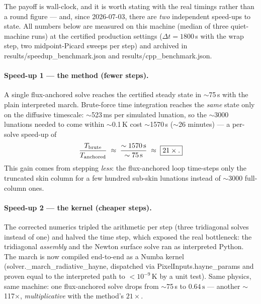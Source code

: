 \documentclass[11pt]{report}
\newcommand{\code}[1]{{\ttfamily\small #1}}
\begin{document}
The payoff is wall-clock, and it is worth stating with the real timings
rather than a round figure --- and, since 2026-07-03, there are \emph{two}
independent speed-ups to state. All numbers below are measured on this
machine (median of three quiet-machine runs) at the certified production
settings ($\Delta t = 1800$\,s with the wrap step, two midpoint-Picard
sweeps per step) and archived in \code{results/speedup\_benchmark.json}
and \code{results/cpp\_benchmark.json}.

\paragraph{\textbf{Speed-up 1 --- the method (fewer steps).}} A single
flux-anchored solve reaches the certified steady state in $\sim$75\,s with
the plain interpreted march. Brute-force time integration reaches the
\emph{same} state only on the diffusive timescale: $\sim$523\,ms per
simulated lunation, so the $\sim$3000 lunations needed to come within
$\sim$0.1\,K cost $\sim$1570\,s ($\sim$26 minutes) --- a per-solve
speed-up of
\[
\frac{T_{\rm brute}}{T_{\rm anchored}}
\;\approx\;\frac{\sim 1570\,\text{s}}{\sim 75\,\text{s}}
\;\approx\;\boxed{21\times.}
\]
This gain comes from stepping \emph{less}: the flux-anchored loop
time-steps only the truncated skin column for a few hundred sub-skin
lunations instead of $\sim$3000 full-column ones.

\paragraph{\textbf{Speed-up 2 --- the kernel (cheaper steps).}} The
corrected numerics tripled the arithmetic per step (three tridiagonal
solves instead of one) and halved the time step, which exposed the real
bottleneck: the tridiagonal \emph{assembly} and the Newton surface solve
ran as interpreted Python. The march is now compiled end-to-end as a Numba
kernel (\code{solver.\_march\_radiative\_hayne}, dispatched via
\code{PixelInputs.hayne\_params} and proven equal to the interpreted path
to $<10^{-9}$\,K by a unit test). Same physics, same machine: one
flux-anchored solve drops from $\sim$75\,s to $\boxed{0.64\,\text{s}}$ ---
another $\sim$117$\times$, \emph{multiplicative} with the method's
$21\times$.
\end{document}
